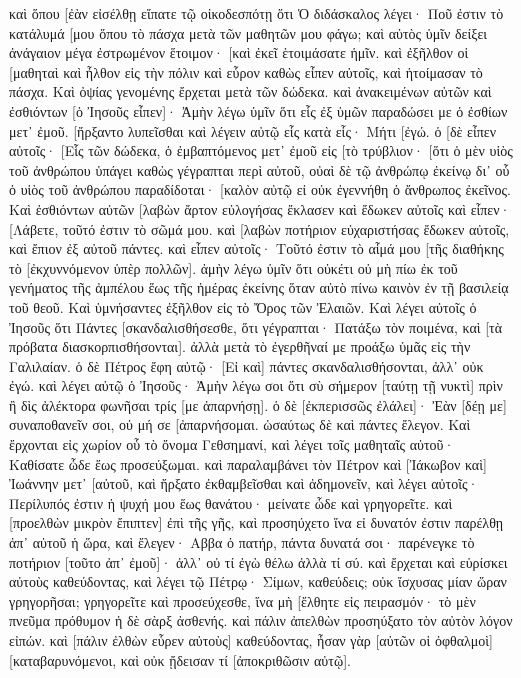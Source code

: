 καὶ ὅπου [ἐὰν εἰσέλθῃ εἴπατε τῷ οἰκοδεσπότῃ ὅτι Ὁ διδάσκαλος λέγει· Ποῦ ἐστιν τὸ κατάλυμά [μου ὅπου τὸ πάσχα μετὰ τῶν μαθητῶν μου φάγω; 
καὶ αὐτὸς ὑμῖν δείξει ἀνάγαιον μέγα ἐστρωμένον ἕτοιμον· [καὶ ἐκεῖ ἑτοιμάσατε ἡμῖν. 
καὶ ἐξῆλθον οἱ [μαθηταὶ καὶ ἦλθον εἰς τὴν πόλιν καὶ εὗρον καθὼς εἶπεν αὐτοῖς, καὶ ἡτοίμασαν τὸ πάσχα. 
Καὶ ὀψίας γενομένης ἔρχεται μετὰ τῶν δώδεκα. 
καὶ ἀνακειμένων αὐτῶν καὶ ἐσθιόντων [ὁ Ἰησοῦς εἶπεν]· Ἀμὴν λέγω ὑμῖν ὅτι εἷς ἐξ ὑμῶν παραδώσει με ὁ ἐσθίων μετ᾽ ἐμοῦ. 
[ἤρξαντο λυπεῖσθαι καὶ λέγειν αὐτῷ εἷς κατὰ εἷς· Μήτι [ἐγώ. 
ὁ [δὲ εἶπεν αὐτοῖς· [Εἷς τῶν δώδεκα, ὁ ἐμβαπτόμενος μετ᾽ ἐμοῦ εἰς [τὸ τρύβλιον· 
[ὅτι ὁ μὲν υἱὸς τοῦ ἀνθρώπου ὑπάγει καθὼς γέγραπται περὶ αὐτοῦ, οὐαὶ δὲ τῷ ἀνθρώπῳ ἐκείνῳ δι᾽ οὗ ὁ υἱὸς τοῦ ἀνθρώπου παραδίδοται· [καλὸν αὐτῷ εἰ οὐκ ἐγεννήθη ὁ ἄνθρωπος ἐκεῖνος. 
Καὶ ἐσθιόντων αὐτῶν [λαβὼν ἄρτον εὐλογήσας ἔκλασεν καὶ ἔδωκεν αὐτοῖς καὶ εἶπεν· [Λάβετε, τοῦτό ἐστιν τὸ σῶμά μου. 
καὶ [λαβὼν ποτήριον εὐχαριστήσας ἔδωκεν αὐτοῖς, καὶ ἔπιον ἐξ αὐτοῦ πάντες. 
καὶ εἶπεν αὐτοῖς· Τοῦτό ἐστιν τὸ αἷμά μου [τῆς διαθήκης τὸ [ἐκχυννόμενον ὑπὲρ πολλῶν]. 
ἀμὴν λέγω ὑμῖν ὅτι οὐκέτι οὐ μὴ πίω ἐκ τοῦ γενήματος τῆς ἀμπέλου ἕως τῆς ἡμέρας ἐκείνης ὅταν αὐτὸ πίνω καινὸν ἐν τῇ βασιλείᾳ τοῦ θεοῦ. 
Καὶ ὑμνήσαντες ἐξῆλθον εἰς τὸ Ὄρος τῶν Ἐλαιῶν. 
Καὶ λέγει αὐτοῖς ὁ Ἰησοῦς ὅτι Πάντες [σκανδαλισθήσεσθε, ὅτι γέγραπται· Πατάξω τὸν ποιμένα, καὶ [τὰ πρόβατα διασκορπισθήσονται]. 
ἀλλὰ μετὰ τὸ ἐγερθῆναί με προάξω ὑμᾶς εἰς τὴν Γαλιλαίαν. 
ὁ δὲ Πέτρος ἔφη αὐτῷ· [Εἰ καὶ] πάντες σκανδαλισθήσονται, ἀλλ᾽ οὐκ ἐγώ. 
καὶ λέγει αὐτῷ ὁ Ἰησοῦς· Ἀμὴν λέγω σοι ὅτι σὺ σήμερον [ταύτῃ τῇ νυκτὶ] πρὶν ἢ δὶς ἀλέκτορα φωνῆσαι τρίς [με ἀπαρνήσῃ]. 
ὁ δὲ [ἐκπερισσῶς ἐλάλει]· Ἐὰν [δέῃ με] συναποθανεῖν σοι, οὐ μή σε [ἀπαρνήσομαι. ὡσαύτως δὲ καὶ πάντες ἔλεγον. 
Καὶ ἔρχονται εἰς χωρίον οὗ τὸ ὄνομα Γεθσημανί, καὶ λέγει τοῖς μαθηταῖς αὐτοῦ· Καθίσατε ὧδε ἕως προσεύξωμαι. 
καὶ παραλαμβάνει τὸν Πέτρον καὶ [Ἰάκωβον καὶ] Ἰωάννην μετ᾽ [αὐτοῦ, καὶ ἤρξατο ἐκθαμβεῖσθαι καὶ ἀδημονεῖν, 
καὶ λέγει αὐτοῖς· Περίλυπός ἐστιν ἡ ψυχή μου ἕως θανάτου· μείνατε ὧδε καὶ γρηγορεῖτε. 
καὶ [προελθὼν μικρὸν ἔπιπτεν] ἐπὶ τῆς γῆς, καὶ προσηύχετο ἵνα εἰ δυνατόν ἐστιν παρέλθῃ ἀπ᾽ αὐτοῦ ἡ ὥρα, 
καὶ ἔλεγεν· Αββα ὁ πατήρ, πάντα δυνατά σοι· παρένεγκε τὸ ποτήριον [τοῦτο ἀπ᾽ ἐμοῦ]· ἀλλ᾽ οὐ τί ἐγὼ θέλω ἀλλὰ τί σύ. 
καὶ ἔρχεται καὶ εὑρίσκει αὐτοὺς καθεύδοντας, καὶ λέγει τῷ Πέτρῳ· Σίμων, καθεύδεις; οὐκ ἴσχυσας μίαν ὥραν γρηγορῆσαι; 
γρηγορεῖτε καὶ προσεύχεσθε, ἵνα μὴ [ἔλθητε εἰς πειρασμόν· τὸ μὲν πνεῦμα πρόθυμον ἡ δὲ σὰρξ ἀσθενής. 
καὶ πάλιν ἀπελθὼν προσηύξατο τὸν αὐτὸν λόγον εἰπών. 
καὶ [πάλιν ἐλθὼν εὗρεν αὐτοὺς] καθεύδοντας, ἦσαν γὰρ [αὐτῶν οἱ ὀφθαλμοὶ] [καταβαρυνόμενοι, καὶ οὐκ ᾔδεισαν τί [ἀποκριθῶσιν αὐτῷ]. 
